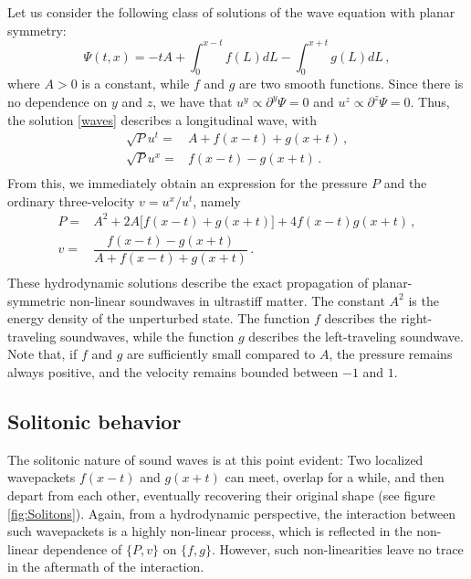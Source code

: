 \documentclass[a4paper, amsfonts, amssymb, amsmath, reprint, showkeys, nofootinbib, twoside,notitlepage,onecolumn]{revtex4-2}
\theoremstyle{definition}
\theoremstyle{theorem}
\theoremstyle{corollary}
\begin{document}
Let us consider the following class of solutions of the wave equation with planar symmetry:
\begin{equation}\label{waves}
\Psi(t,x)= -t A + \int_0^{x-t} f(L) dL -\int_0^{x+t} g(L) dL \, ,
\end{equation}
where $A>0$ is a constant, while $f$ and $g$ are two smooth functions. Since there is no dependence on $y$ and $z$, we have that $u^y \propto\partial^y \Psi =0$ and $u^z \propto\partial^z \Psi =0$. Thus, the solution \eqref{waves} describes a longitudinal wave, with
\begin{equation}
\begin{split}
\sqrt{P} u^t ={}& A+f(x{-}t)+g(x{+}t) \, , \\
\sqrt{P} u^x ={}& f(x{-}t)-g(x{+}t) \, . \\
\end{split}
\end{equation}
From this, we immediately obtain an expression for the pressure $P$ and the ordinary three-velocity $v=u^x/u^t$, namely
\begin{equation}
\begin{split}
P={}& A^2+2A\big[f(x{-}t)+g(x{+}t)]+4f(x{-}t)g(x{+}t)   \, , \\
v={}& \dfrac{f(x{-}t)-g(x{+}t)}{A+f(x{-}t)+g(x{+}t)} \, . \\
\end{split}
\end{equation}
These hydrodynamic solutions describe the exact propagation of planar-symmetric non-linear soundwaves in ultrastiff matter. The constant $A^2$ is the energy density of the unperturbed state. The function $f$ describes the right-traveling soundwaves, while the function $g$ describes the left-traveling soundwave. Note that, if $f$ and $g$ are sufficiently small compared to $A$, the pressure remains always positive, and the velocity remains bounded between $-1$ and $1$.

\vspace{-0.3cm}
\subsection{Solitonic behavior}
\vspace{-0.3cm}

The solitonic nature of sound waves is at this point evident: Two localized wavepackets $f(x-t)$ and $g(x+t)$ can meet, overlap for a while, and then depart from each other, eventually recovering their original shape (see figure \ref{fig:Solitons}). Again, from a hydrodynamic perspective, the interaction between such wavepackets is a highly non-linear process, which is reflected in the non-linear dependence of $\{P,v\}$ on $\{f,g\}$. However, such non-linearities leave no trace in the aftermath of the interaction.
\end{document}
